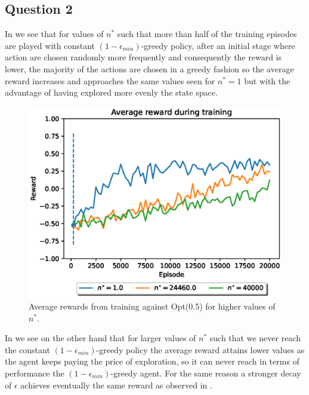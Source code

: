 \documentclass[10pt]{IEEEtran}
\begin{document}
\subsection*{Question 2}
In  we see that for values of $n^{*}$ such that more than half of the training episodes are played with constant $(1-\epsilon_{min})$-greedy policy, after an initial stage where action are chosen randomly more frequently and consequently the reward is lower, the majority of the actions are chosen in a greedy fashion so the average reward increases and approaches the same values seen for $n^{*} = 1$ but with the advantage of having explored more evenly the state space. 
\begin{figure}[H]
    \centering
    \includegraphics[width = 0.85\linewidth]{code/figures/rewards_n_star_first.eps}
    \caption{Average rewards from training against Opt(0.5) for higher values of $n^{*}$.}
    \label{firstplot_question2}
\end{figure}
In  we see on the other hand that for larger values of $n^{*}$ such that we never reach the constant $(1-\epsilon_{min})$-greedy policy the average reward attains lower values as the agent keeps paying the price of exploration, so it can never reach in terms of performance the $(1-\epsilon_{min})$-greedy agent. For the same reason a stronger decay of $\epsilon$ achieves eventually the same reward as observed in .
\end{document}
